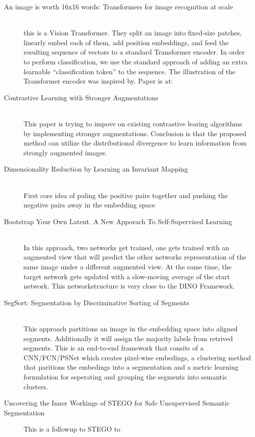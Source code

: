\begin{description}
    \item [An image is worth 16x16 words: Transformers for image recognition at scale] \hfill \\ this is a Vision Transformer. They split an image into fixed-size patches, linearly embed each of them, add position embeddings, and feed the resulting sequence of vectors to a standard Transformer encoder. In order to perform classification, we use the standard approach of adding an extra learnable “classification token” to the sequence. The illustration of the Transformer encoder was inspired by\cite{NIPS2017_3f5ee243}. Paper is at:\cite{dosovitskiy2021image}
    \item [Contrastive Learning with Stronger Augmentations] \hfill \\ This paper is trying to impove on existing contrastive learing algorithms by implementing stronger augmentations. Conclusion is that the proposed method can utilize the distributional divergence to learn information from strongly augmented images. \cite{wang2022contrastive}
    \item [Dimensionality Reduction by Learning an Invariant Mapping] \hfill \\ First core idea of puling the positive pairs together and pushing the negative pairs away in the embedding space\cite{hadsell2006dimensionality}
    \item [Bootstrap Your Own Latent. A New Apporach To Self-Supervised Learning]\hfill \\ In this approach, two networks get trained, one gets trained with an augmented view that will predict the other networks representation of the same image under a different augmented view. At the same time, the target network gets updated with a slow-moving average of the start network. This networkstructure is very close to the DINO Framework. \cite{grill2020bootstrap}
    \item [SegSort: Segmentation by Discriminative Sorting of Segments] \hfill \\ This approach partitions an image in the embedding space into aligned segments. Additionally it will assign the majority labels from retrived segments. This is an end-to-end framework that consits of a CNN/FCN/PSNet which creates pixel-wise embedings, a clustering method that paritions the embedings into a segmentation and a metric learning formulation for seperating and grouping the segments into semantic clusters.  \cite{hwang2019segsort}
    \item[Uncovering the Inner Workings of STEGO for Safe Unsupervised Semantic Segmentation] This is a followup to STEGO to  
\end{description}



